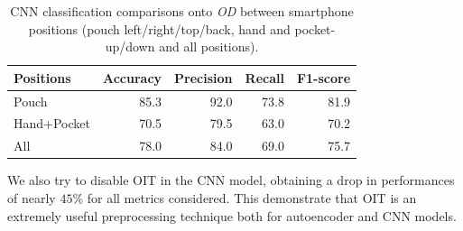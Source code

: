 \begin{table}[b]
  	\centering
	\begin{tabular}{p{1.8cm}rrrr}
	  \hline
	  Positions & Accuracy & Precision & Recall & F1-score \\
	  \hline
	  Pouch & 85.3 & 92.0 & 73.8 & 81.9 \\
	  Hand+Pocket & 70.5 & 79.5 & 63.0 & 70.2 \\
	  All & 78.0 & 84.0 & 69.0 & 75.7 \\
	  \hline
	\end{tabular}
	\caption{CNN classification comparisons onto \textit{OD} between
	  smartphone positions (pouch left/right/top/back, hand and
	  pocket-up/down and all positions).}
	\label{tab:model-oit-performance}
	\end{table}

We also try to disable OIT in the CNN model, obtaining a drop in performances of nearly $45$\% for all metrics considered. This demonstrate that OIT is an extremely useful preprocessing technique both for autoencoder and CNN models.
